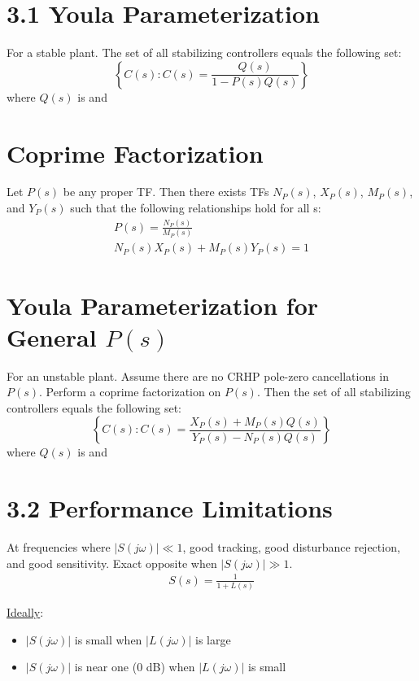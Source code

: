 \section*{3.1 Youla Parameterization}
For a stable plant. The set of all stabilizing controllers equals the following set:
\[
    \left\{
    C(s) : C(s) = \frac{ Q(s) }{ 1 - P(s) Q(s) }
    \right\}
\]
where \( Q(s) \) is \underline{} and \underline{} \\

\section*{Coprime Factorization}
Let \( P(s) \) be any proper TF. Then there exists \underline{}
\underline{} TFs \( N_P(s) \), \( X_P(s) \), \( M_P(s) \), and \( Y_P(s) \)
such that the following relationships hold for all s:
\begin{gather*}
    P(s) = \frac{ N_P(s) }{ M_P(s) }\\
    N_P(s) X_P(s) + M_P(s) Y_P(s) = 1
\end{gather*}

\section*{Youla Parameterization for General \( P(s) \)}
For an unstable plant. Assume there are no CRHP pole-zero cancellations in \( P(s) \).
Perform a coprime factorization on \( P(s) \).
Then the set of all stabilizing controllers equals the following set:
\[
    \left\{
    C(s) : C(s) = \frac{ X_P(s) + M_P(s)Q(s) }{ Y_P(s) - N_P(s) Q(s) }
    \right\}
\]
where \( Q(s) \) is \underline{} and \underline{} \\

\section*{3.2 Performance Limitations}
At frequencies where \( | S(j\omega) | \ll 1 \),
good tracking, good disturbance rejection, and good sensitivity. Exact opposite when
\( | S(j\omega) | \gg 1 \).
\begin{gather*}
    S(s) = \frac{ 1 }{ 1 + L(s) }
\end{gather*}

\underline{Ideally}:
\begin{itemize}
    \item \( |S(j\omega)| \) is small when \( |L(j\omega)| \) is large
    \item \( |S(j\omega)| \) is near one (0 dB) when \( |L(j\omega)| \) is small
\end{itemize}

